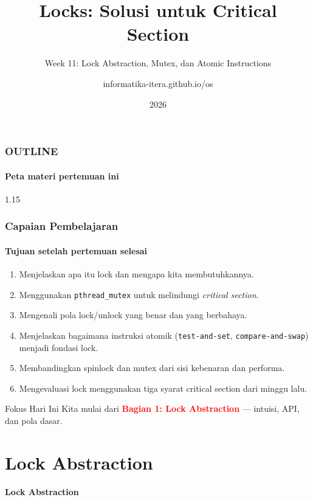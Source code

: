\documentclass[t,aspectratio=169,xcolor=dvipsnames]{beamer}
\title[Locks \& Mutex]{Locks: Solusi untuk Critical Section}
\subtitle{Week 11: Lock Abstraction, Mutex, dan Atomic Instructions}
\author[informatika-itera.github.io/os]{informatika-itera.github.io/os}
\institute[ITERA]{Program Studi Teknik Informatika \\ Institut Teknologi Sumatera}
\date{\textcolor{nyublue}{2026}}
\newcommand{\tem}[1]{\textbf{\textcolor{red}{#1}}}
\begin{document}
\begin{frame}
    \titlepage
\end{frame}

\begin{frame}
    \frametitle{OUTLINE}
    \framesubtitle{Peta materi pertemuan ini}
    \small
    \begin{spacing}{1.15}
        \tableofcontents
    \end{spacing}
\end{frame}

\begin{frame}
    \frametitle{Capaian Pembelajaran}
    \framesubtitle{Tujuan setelah pertemuan selesai}
    \small
    \begin{enumerate}
        \item Menjelaskan apa itu lock dan mengapa kita membutuhkannya.
        \item Menggunakan \texttt{pthread\_mutex} untuk melindungi \textit{critical section}.
        \item Mengenali pola lock/unlock yang benar dan yang berbahaya.
        \item Menjelaskan bagaimana instruksi atomik (\texttt{test-and-set}, \texttt{compare-and-swap}) menjadi fondasi lock.
        \item Membandingkan spinlock dan mutex dari sisi kebenaran dan performa.
        \item Mengevaluasi lock menggunakan tiga syarat critical section dari minggu lalu.
    \end{enumerate}
    \begin{exampleblock}{Fokus Hari Ini}
        Kita mulai dari \tem{Bagian 1: Lock Abstraction} — intuisi, API, dan pola dasar.
    \end{exampleblock}
\end{frame}

\section{Lock Abstraction}

\begin{frame}[plain]
    \begin{center}
        \vspace{3cm}
        \Huge\textbf{Lock Abstraction}
    \end{center}
\end{frame}
\end{document}
